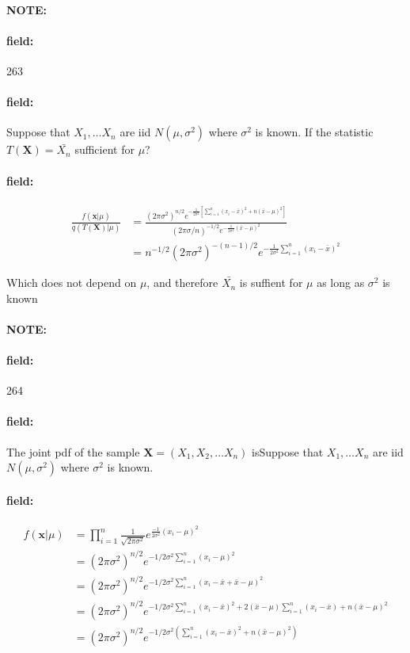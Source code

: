 \documentclass[12pt]{article}
\newenvironment{note}{\paragraph{NOTE:}}{}
\newenvironment{field}{\paragraph{field:}}{}
\begin{document}
\begin{note} \begin{field} \tiny 263 \end{field}
  \begin{field}
    Suppose that $X_1, \ldots X_n$ are iid $N(\mu,\sigma^2)$ where $\sigma^2$ is known. If the statistic $T(\mathbf{X}) = \bar{X_n}$ sufficient for $\mu$?
  \end{field}
  \begin{field}
    \begin{align*}
       \frac{f(\mathbf{x}|\mu)}{q(T(\mathbf{X})|\mu)} &=
       \frac{(2\pi\sigma^2)^{n/2}e^{-\frac{1}{2\sigma^2}[\sum_{i = 1}^n(x_i - \bar{x})^2 + n(\bar{x} - \mu)^2]}}{(2\pi\sigma/n)^{-1/2}e^{-\frac{1}{2\sigma^2}(\bar{x}-\mu)^2}}\\
       &= n^{-1/2}(2\pi\sigma^2)^{-(n-1)/2}e^{-\frac{1}{2\sigma^2}\sum_{i = 1}^n(x_i - \bar{x})^2}
    \end{align*}

    Which does not depend on $\mu$, and therefore $\bar{X_n}$ is suffient for $\mu$ as long as $\sigma^2$ is known
  \end{field}
\end{note}

\begin{note} \begin{field} \tiny 264 \end{field}
  \begin{field}
    The joint pdf of the sample $\mathbf{X} =(X_1, X_2, \ldots X_n)$ isSuppose that $X_1, \ldots X_n$ are iid $N(\mu,\sigma^2)$ where $\sigma^2$ is known.
  \end{field}
  \begin{field}
    \begin{align*}
      f(\mathbf{x}|\mu) &= \prod_{i = 1}^n \frac{1}{\sqrt{2\pi\sigma^2}} e^{\frac{-1}{2\sigma^2}(x_i - \mu)^2}\\
      &= (2\pi\sigma^2)^{n/2} e^{-1/2\sigma^2 \sum_{i = 1}^n (x_i - \mu)^2}\\
      &= (2\pi\sigma^2)^{n/2} e^{-1/2\sigma^2 \sum_{i = 1}^n (x_i - \bar{x} + \bar{x} - \mu)^2}\\
      &= (2\pi\sigma^2)^{n/2} e^{-1/2\sigma^2 \sum_{i = 1}^n (x_i - \bar{x})^2 + 2(\bar{x} - \mu)\sum_{i = 1}^n (x_i - \bar{x}) + n(\bar{x} - \mu)^2}\\
      &= (2\pi\sigma^2)^{n/2}e^{-1/2\sigma^2 (\sum_{i = 1}^n (x_i - \bar{x})^2 + n(\bar{x} - \mu)^2)}
    \end{align*}
  \end{field}
\end{note}
\end{document}
